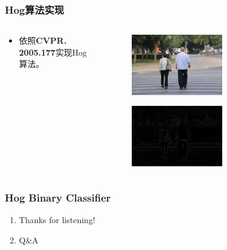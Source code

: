 \documentclass[notheorems, aspectratio=54]{beamer}
\begin{document}
\begin{frame}
\frametitle{Hog算法实现}
\begin{columns}
\begin{column}{.3\linewidth}
\begin{itemize}
	\item 依照\textbf{CVPR. 2005.177}实现Hog算法。
\end{itemize}
\end{column}
\begin{column}{.7\linewidth}
\begin{figure}[htbp]
	\centering
	\includegraphics[width=0.6\textwidth]{example.jpg}
\end{figure}
\begin{figure}[htbp]
	\centering
	\includegraphics[width=0.6\textwidth]{example-hog.jpg}
\end{figure}
\end{column}
\end{columns}
\end{frame}

\begin{frame}
\frametitle{Hog Binary Classifier}
\begin{enumerate}
	\item Thanks for listening!
	\item Q\&A
\end{enumerate}
\end{frame}
\end{document}
